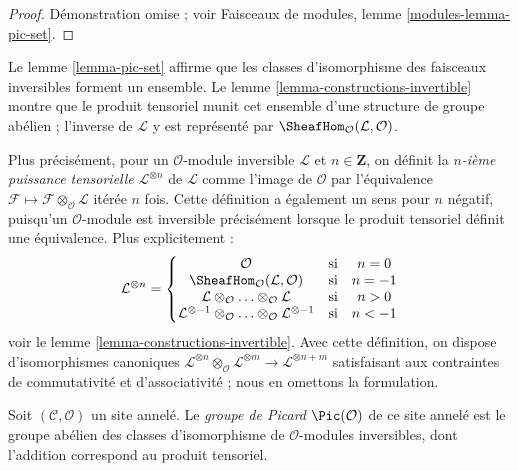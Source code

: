 \begin{proof}
Démonstration omise ; voir Faisceaux de modules, lemme
\ref{modules-lemma-pic-set}.
\end{proof}

\noindent
Le lemme \ref{lemma-pic-set} affirme que les classes d'isomorphisme des
faisceaux inversibles forment un ensemble. Le lemme
\ref{lemma-constructions-invertible} montre que le produit tensoriel munit
cet ensemble d'une structure de groupe abélien ; l'inverse de
$\mathcal{L}$ y est représenté par
$\SheafHom_\mathcal{O}(\mathcal{L}, \mathcal{O})$.

\medskip\noindent
Plus précisément, pour un $\mathcal{O}$-module inversible $\mathcal{L}$ et
$n \in \mathbf{Z}$, on définit la {\it $n$-ième puissance tensorielle}
$\mathcal{L}^{\otimes n}$ de $\mathcal{L}$ comme l'image de $\mathcal{O}$
par l'équivalence $\mathcal{F} \mapsto
\mathcal{F} \otimes_\mathcal{O} \mathcal{L}$ itérée $n$ fois. Cette
définition a également un sens pour $n$ négatif, puisqu'un
$\mathcal{O}$-module est inversible précisément lorsque le produit tensoriel
définit une équivalence.
Plus explicitement :
$$
\mathcal{L}^{\otimes n} =
\left\{
\begin{matrix}
\mathcal{O} & \text{si} & n = 0 \\
\SheafHom_\mathcal{O}(\mathcal{L}, \mathcal{O}) & \text{si} & n = -1\\
\mathcal{L} \otimes_\mathcal{O} \ldots \otimes_\mathcal{O} \mathcal{L}
& \text{si} & n > 0 \\
\mathcal{L}^{\otimes -1} \otimes_\mathcal{O} \ldots
\otimes_\mathcal{O} \mathcal{L}^{\otimes -1}
& \text{si} & n < -1
\end{matrix}
\right.
$$
voir le lemme \ref{lemma-constructions-invertible}. Avec cette définition,
on dispose d'isomorphismes canoniques
$\mathcal{L}^{\otimes n} \otimes_\mathcal{O}
\mathcal{L}^{\otimes m} \to
\mathcal{L}^{\otimes n + m}$ satisfaisant aux contraintes de commutativité
et d'associativité ; nous en omettons la formulation.

\begin{definition}

\label{definition-pic}
Soit $(\mathcal{C}, \mathcal{O})$ un site annelé. Le {\it groupe de Picard}
$\Pic(\mathcal{O})$ de ce site annelé est le groupe abélien des classes
d'isomorphisme de $\mathcal{O}$-modules inversibles, dont l'addition
correspond au produit tensoriel.
\end{definition}









